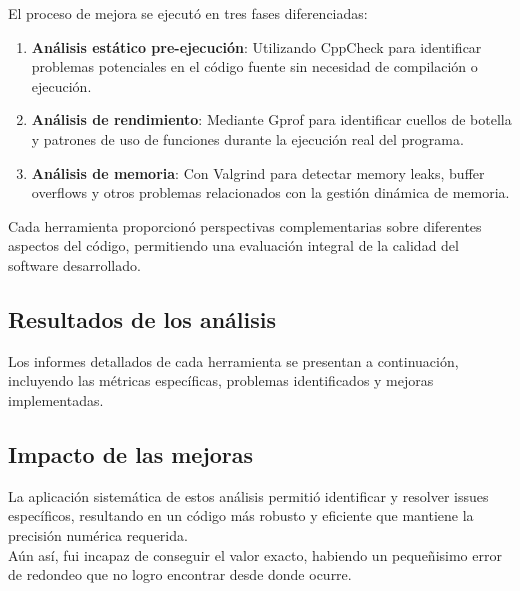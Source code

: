 \documentclass[12pt,a4paper]{article}
\begin{document}
\begin{markdown}
\begin{markdown}
El proceso de mejora se ejecutó en tres fases diferenciadas:

\begin{enumerate}
\item \textbf{Análisis estático pre-ejecución}: Utilizando CppCheck para identificar problemas potenciales en el código fuente sin necesidad de compilación o ejecución.

\item \textbf{Análisis de rendimiento}: Mediante Gprof para identificar cuellos de botella y patrones de uso de funciones durante la ejecución real del programa.

\item \textbf{Análisis de memoria}: Con Valgrind para detectar memory leaks, buffer overflows y otros problemas relacionados con la gestión dinámica de memoria.
\end{enumerate}

Cada herramienta proporcionó perspectivas complementarias sobre diferentes aspectos del código, permitiendo una evaluación integral de la calidad del software desarrollado.

\subsection{Resultados de los análisis}

Los informes detallados de cada herramienta se presentan a continuación, incluyendo las métricas específicas, problemas identificados y mejoras implementadas.




\subsection{Impacto de las mejoras}

La aplicación sistemática de estos análisis permitió identificar y resolver issues específicos, resultando en un código más robusto y eficiente que mantiene la precisión numérica requerida.
\\
Aún así, fui incapaz de conseguir el valor exacto, habiendo un pequeñisimo error de redondeo que no logro encontrar desde donde ocurre.


\end{markdown}
\end{markdown}
\end{document}
